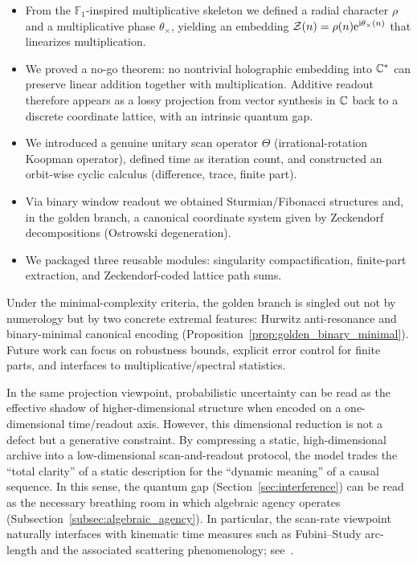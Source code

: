 \begin{itemize}
    \item From the $\mathbb{F}_1$-inspired multiplicative skeleton we defined a radial character $\rho$ and a multiplicative phase $\theta_\times$, yielding an embedding $\mathcal{Z}(n)=\rho(n)\mathrm{e}^{\mathrm{i}\theta_\times(n)}$ that linearizes multiplication.
    \item We proved a no-go theorem: no nontrivial holographic embedding into $\mathbb{C}^*$ can preserve linear addition together with multiplication. Additive readout therefore appears as a lossy projection from vector synthesis in $\mathbb{C}$ back to a discrete coordinate lattice, with an intrinsic quantum gap.
    \item We introduced a genuine unitary scan operator $\Theta$ (irrational-rotation Koopman operator), defined time as iteration count, and constructed an orbit-wise cyclic calculus (difference, trace, finite part).
    \item Via binary window readout we obtained Sturmian/Fibonacci structures and, in the golden branch, a canonical coordinate system given by Zeckendorf decompositions (Ostrowski degeneration).
    \item We packaged three reusable modules: singularity compactification, finite-part extraction, and Zeckendorf-coded lattice path sums.
\end{itemize}

Under the minimal-complexity criteria, the golden branch is singled out not by numerology but by two concrete extremal features: Hurwitz anti-resonance and binary-minimal canonical encoding (Proposition~\ref{prop:golden_binary_minimal}). Future work can focus on robustness bounds, explicit error control for finite parts, and interfaces to multiplicative/spectral statistics.
\par
In the same projection viewpoint, probabilistic uncertainty can be read as the effective shadow of higher-dimensional structure when encoded on a one-dimensional time/readout axis.
However, this dimensional reduction is not a defect but a generative constraint. By compressing a static, high-dimensional archive into a low-dimensional scan-and-readout protocol, the model trades the ``total clarity'' of a static description for the ``dynamic meaning'' of a causal sequence. In this sense, the quantum gap (Section~\ref{sec:interference}) can be read as the necessary breathing room in which algebraic agency operates (Subsection~\ref{subsec:algebraic_agency}).
In particular, the scan-rate viewpoint naturally interfaces with kinematic time measures such as Fubini--Study arc-length and the associated scattering phenomenology; see~\cite{Ma2025FSTime}.
